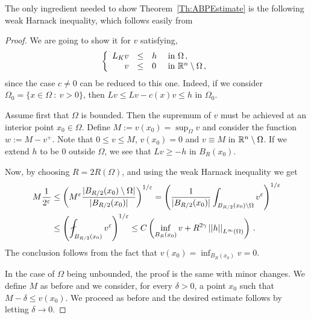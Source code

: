 The only ingredient needed to show Theorem~\ref{Th:ABPEstimate} is the following weak Harnack inequality, which follows easily from \cite{DiCastoKuusiPalatucci}


\begin{proof}
	We are going to show it for $v$ satisfying,
	$$
	\left\{\begin{array}{rcll}
	L_K v &\leq & h & \text{ in } \Omega\,, \\
	v & \leq & 0 & \text{ in } \mathbb{R}^n\setminus \Omega\,,
	\end{array} \right.
	$$
	since the case $c\neq 0$ can be reduced to this one. Indeed, if we consider $\Omega_0 = \{x \in \Omega \ : \ v > 0\}$, then $Lv \leq Lv - c(x)v \leq h$ in $\Omega_0$.
	
	Assume first that $\Omega$ is bounded. Then the supremum of $v$ must be achieved at an interior point $x_0\in \Omega$. Define	$M:= v(x_0) = \sup_\Omega v$ and consider the function $w := M - v^+$. Note that $0 \leq v \leq M$, $v(x_0) = 0$ and $v \equiv M$ in $\mathbb{R}^n \setminus \Omega$. If we extend $h$ to be $0$ outside $\Omega$, we see that $Lv \geq -h$ in $B_R(x_0)$.
	
	Now, by choosing $R= 2R(\Omega)$, and using the weak Harnack inequality  we get
	\begin{align*}
	M \dfrac{1}{2^\varepsilon} & \leq \bpar{M^{\varepsilon}\dfrac{|B_{R/2}(x_0)\setminus \Omega|}{|B_{R/2}(x_0)|}}^{1/\varepsilon}= \bpar{\dfrac{1}{|B_{R/2}(x_0)|} \int_{B_{R/2}(x_0)\setminus \Omega} v^\varepsilon}^{1/\varepsilon} \\
	& \leq \bpar{ \fint_{B_{R/2}(x_0)} v^\varepsilon}^{1/\varepsilon} \leq C \bpar{\inf_{B_{R}(x_0)} v + R^{2\s} \norm{h}_{L^{\infty}(\Omega)} }\,.
	\end{align*}
	The conclusion follows from the fact that $v(x_0)= \inf_{B_{R}(x_0)} v = 0$.
	
	In the case of $\Omega$ being unbounded, the proof is the same with minor changes. We define $M$ as before and we consider, for every $\delta > 0$, a point $x_0$ such that $M-\delta \leq v(x_0)$. We proceed as before and the desired estimate follows by letting $\delta \to 0$.
\end{proof}




